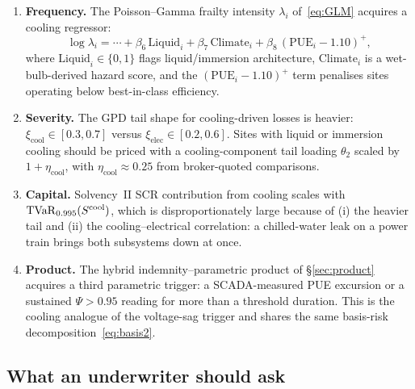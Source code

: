 \begin{enumerate}[leftmargin=*,nosep,topsep=4pt]
   \item \textbf{Frequency.} The Poisson--Gamma frailty intensity
         $\lambda_i$ of~\eqref{eq:GLM} acquires a cooling regressor:
         \begin{equation}\label{eq:GLM-cool}
            \log \lambda_i = \cdots
            + \beta_6\,\mathrm{Liquid}_i
            + \beta_7\,\mathrm{Climate}_i
            + \beta_8\,(\mathrm{PUE}_i - 1.10)^+,
         \end{equation}
         where $\mathrm{Liquid}_i\in\{0,1\}$ flags liquid/immersion
         architecture, $\mathrm{Climate}_i$ is a wet-bulb-derived
         hazard score, and the $(\mathrm{PUE}_i-1.10)^+$ term
         penalises sites operating below best-in-class efficiency.

   \item \textbf{Severity.} The GPD tail shape for cooling-driven
         losses is heavier:
         $\xi_{\mathrm{cool}}\in[0.3,0.7]$ versus
         $\xi_{\mathrm{elec}}\in[0.2,0.6]$.
         Sites with liquid or immersion cooling should be priced
         with a cooling-component tail loading $\theta_2$ scaled by
         $1+\eta_{\mathrm{cool}}$, with $\eta_{\mathrm{cool}}\approx 0.25$
         from broker-quoted comparisons.

   \item \textbf{Capital.} Solvency~II SCR contribution from cooling
         scales with $\operatorname{TVaR}_{0.995}(S^{\mathrm{cool}})$, which is
         disproportionately large because of (i) the heavier tail
         and (ii) the cooling--electrical correlation: a chilled-water
         leak on a power train brings both subsystems down at once.

   \item \textbf{Product.} The hybrid indemnity--parametric product
         of \S\ref{sec:product} acquires a third parametric trigger:
         a SCADA-measured PUE excursion or a sustained $\Psi>0.95$
         reading for more than a threshold duration. This is the
         cooling analogue of the voltage-sag trigger and shares the
         same basis-risk decomposition~\eqref{eq:basis2}.
\end{enumerate}

\subsection{What an underwriter should ask}\label{ss:cool-underwriting}

